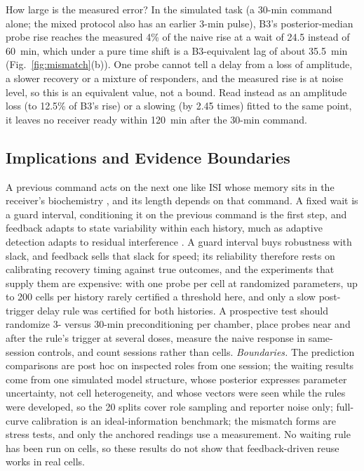 \documentclass[conference]{IEEEtran}
\begin{document}
How large is the measured error? In the simulated task (a 30-min command alone; the mixed protocol also has an earlier 3-min pulse), B3's posterior-median probe rise reaches the measured 4\% of the naive rise at a wait of 24.5 instead of 60~min, which under a pure time shift is a B3-equivalent lag of about 35.5~min (Fig.~\ref{fig:mismatch}(b)). One probe cannot tell a delay from a loss of amplitude, a slower recovery or a mixture of responders, and the measured rise is at noise level, so this is an equivalent value, not a bound. Read instead as an amplitude loss (to 12.5\% of B3's rise) or a slowing (by 2.45 times) fitted to the same point, it leaves no receiver ready within 120~min after the 30-min command.

\subsection{Implications and Evidence Boundaries}
A previous command acts on the next one like ISI whose memory sits in the receiver's biochemistry \cite{jamali2019,tepekule2015}, and its length depends on that command. A fixed wait is a guard interval, conditioning it on the previous command is the first step, and feedback adapts to state variability within each history, much as adaptive detection adapts to residual interference \cite{damrath2016,mosayebi2014}. A guard interval buys robustness with slack, and feedback sells that slack for speed; its reliability therefore rests on calibrating recovery timing against true outcomes, and the experiments that supply them are expensive: with one probe per cell at randomized parameters, up to 200 cells per history rarely certified a threshold here, and only a slow post-trigger delay rule was certified for both histories. A prospective test should randomize 3- versus 30-min preconditioning per chamber, place probes near and after the rule's trigger at several doses, measure the naive response in same-session controls, and count sessions rather than cells. \emph{Boundaries.} The prediction comparisons are post hoc on inspected roles from one session; the waiting results come from one simulated model structure, whose posterior expresses parameter uncertainty, not cell heterogeneity, and whose vectors were seen while the rules were developed, so the 20 splits cover role sampling and reporter noise only; full-curve calibration is an ideal-information benchmark; the mismatch forms are stress tests, and only the anchored readings use a measurement. No waiting rule has been run on cells, so these results do not show that feedback-driven reuse works in real cells.
\end{document}
